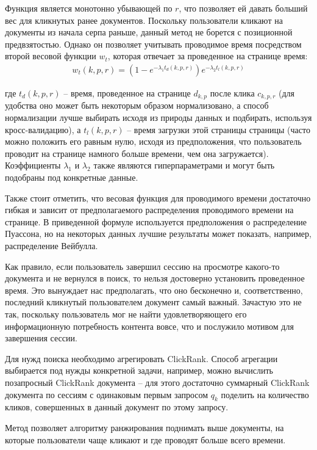 \documentclass[diploma]{nanolab2015}
\begin{document}
Функция является монотонно убывающей по $r$, что позволяет ей давать больший вес для кликнутых ранее документов. Поскольку пользователи кликают на документы из начала серпа раньше, данный метод не борется с позиционной предвзятостью. Однако он позволяет учитывать проводимое время посредством второй весовой функции $w_t$, которая отвечает за проведенное на странице время:
\begin{align}
    w_t(k,p,r) = (1 - e^{-\lambda_1 t_d(k,p,r)})e^{-\lambda_2 t_l(k,p,r)}
\end{align}

где $t_d(k,p,r)$ -- время, проведенное на странице $d_{k,p}$ после клика $c_{k,p,r}$ (для удобства оно может быть некоторым образом нормализовано, а способ нормализации лучше выбирать исходя из природы данных и подбирать, используя кросс-валидацию), а $t_l(k,p,r)$ -- время загрузки этой страницы страницы (часто можно положить его равным нулю, исходя из предположения, что пользователь проводит на странице намного больше времени, чем она загружается). Коэффициенты $\lambda_1$ и $\lambda_2$ также являются гиперпараметрами и могут быть подобраны под конкретные данные.

Также стоит отметить, что весовая функция для проводимого времени достаточно гибкая и зависит от предполагаемого распределения проводимого времени на странице. В приведенной формуле используется предположения о распределение Пуассона, но на некоторых данных лучшие результаты может показать, например, распределение Вейбулла.

Как правило, если пользователь завершил сессию на просмотре какого-то документа и не вернулся в поиск, то нельзя достоверно установить проведенное время. Это вынуждает нас предполагать, что оно бесконечно и, соответственно, последний кликнутый пользователем документ самый важный. Зачастую это не так, поскольку пользователь мог не найти удовлетворяющего его информационную потребность контента вовсе, что и послужило мотивом для завершения сессии.

Для нужд поиска необходимо агрегировать ClickRank. Способ агрегации выбирается под нужды конкретной задачи, например, можно вычислить позапросный ClickRank документа -- для этого достаточно суммарный ClickRank документа по сессиям с одинаковым первым запросом $q_k$ поделить на количество кликов, совершенных в данный документ по этому запросу.

Метод позволяет алгоритму ранжирования поднимать выше документы, на которые пользователи чаще кликают и где проводят больше всего времени.
\end{document}
